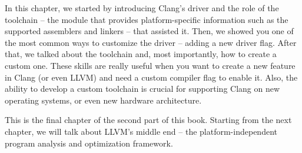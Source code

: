 In this chapter, we started by introducing Clang's driver and the role of the toolchain – the module that provides platform-specific information such as the supported assemblers and linkers – that assisted it. Then, we showed you one of the most common ways to customize the driver – adding a new driver flag. After that, we talked about the toolchain and, most importantly, how to create a custom one. These skills are really useful when you want to create a new feature in Clang (or even LLVM) and need a custom compiler flag to enable it. Also, the ability to develop a custom toolchain is crucial for supporting Clang on new operating systems, or even new hardware architecture.

This is the final chapter of the second part of this book. Starting from the next chapter, we will talk about LLVM's middle end – the platform-independent program analysis and optimization framework.